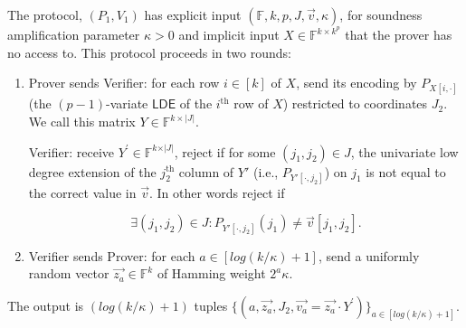 \documentclass[10pt,a4paper]{article}
\makeatletter
\newcommand{\LDE}{\mathsf{LDE}}
\newcommand{\F}{\mathbb{F}}
\newenvironment{protocol}[1][htb]{
    \renewcommand{\ALG@name}{Protocol}
    \begin{algorithm}[#1]
    }{\end{algorithm}
}
\makeatother
\begin{document}
\begin{protocol}
\caption{Polynomial Folding Protocol}
\label{TensRedAlg}
The protocol, $(P_{1}, V_{1})$ has explicit input $(\F,k,p,J,\Vec{v},\kappa)$, for soundness amplification parameter $\kappa>0$ and implicit input $X\in\F^{k\times k^{p}}$ that the prover has no access to. This protocol proceeds in two rounds:

\begin{enumerate}
    \item Prover sends Verifier: for each row $i \in [k]$ of $X$, send its encoding by $P_{X[i,\cdot]}$ (the $(p-1)$-variate $\LDE$ of the $i^{\text{th}}$ row of $X$) restricted to coordinates $J_{2}$. We call this matrix $Y\in\F^{k\times |J|}$.

    Verifier: receive $Y^\prime\in \F^{k\times \vert J\vert }$, reject if for some $(j_{1},j_{2})\in J$, the univariate low degree extension of the $j_{2}^{\text{th}}$ column of $Y'$ (i.e., $P_{Y'[\cdot,j_{2}]}$) on $j_{1}$ is not equal to the correct value in $\vec{v}$. In other words reject if 

    \begin{equation*}
        \exists (j_{1}, j_{2})\in J: P_{Y'[\cdot,j_{2}]}(j_{1})\neq \Vec{v}[j_{1}, j_{2}].
    \end{equation*}
    
    \item \label{VPrandvecpolyfold} Verifier sends Prover: for each $a \in [log(k/\kappa) + 1]$, send a uniformly random vector $\vec{z_{a}} \in \F^{k}$ of Hamming weight $2^{a}\kappa$.
\end{enumerate}
The output is $(log(k/\kappa) + 1)$ tuples $\{(a, \vec{z_{a}}, J_{2}, \vec{v_{a}}=\vec{z_{a}}\cdot  Y^\prime)\}_{a\in[log(k/\kappa)+1]}$.
\end{protocol}
\end{document}
